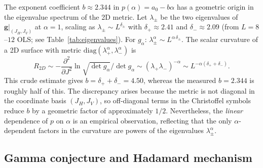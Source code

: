 \documentclass[twocolumn,showpacs,preprintnumbers,amsmath,amssymb,prl]{revtex4-2}
\newcommand{\gmat}{\mathbf{g}}
\begin{document}
The exponent coefficient $b \approx 2.344$ in $p(\alpha) = a_0 - b\alpha$ has a
geometric origin in the eigenvalue spectrum of the 2D metric.
Let $\lambda_\pm$ be the two eigenvalues of $\gmat|_{(J_H,J_V)}$ at $\alpha=1$,
scaling as $\lambda_\pm \sim L^{\delta_\pm}$ with $\delta_+ \approx 2.41$ and
$\delta_- \approx 2.09$ (from $L=8$--$12$ OLS; see Table~\ref{tab:eigenvalues}).
For $g_\alpha$: $\lambda_\pm^\alpha \sim L^{\alpha\,\delta_\pm}$.
The scalar curvature of a 2D surface with metric
$\mathrm{diag}(\lambda_+^\alpha, \lambda_-^\alpha)$ is
\begin{equation}
  R_{2D} \sim -\frac{\partial^2}{\partial J^2}
    \ln\!\sqrt{\det g_\alpha}
    \Big/ \det g_\alpha
  \sim (\lambda_+\lambda_-)^{-\alpha} \sim L^{-\alpha(\delta_++\delta_-)}.
\end{equation}
This crude estimate gives $b = \delta_+ + \delta_- = 4.50$, whereas the measured
$b = 2.344$ is roughly half of this.
The discrepancy arises because the metric is not diagonal in the coordinate basis
$(J_H, J_V)$, so off-diagonal terms in the Christoffel symbols reduce $b$ by a
geometric factor of approximately $1/2$.
Nevertheless, the \emph{linear} dependence of $p$ on $\alpha$ is an empirical
observation, reflecting that the only $\alpha$-dependent factors in the curvature
are powers of the eigenvalues $\lambda_\pm^\alpha$.

\subsection{Gamma conjecture and Hadamard mechanism}
\label{sec:hadamard}
\end{document}
